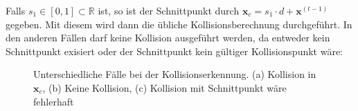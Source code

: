 Falls $s_1 \in [0, 1] \subset \mathbb{R}$ ist, so ist der Schnittpunkt durch $\textbf{x}_c = s_1 \cdot d + \textbf{x}^{(t-1)}$ gegeben. 
Mit diesem wird dann die übliche Kollisionsberechnung durchgeführt.
In den anderen Fällen darf keine Kollision ausgeführt werden, da entweder kein Schnittpunkt exisiert oder der Schnittpunkt kein gültiger Kollisionspunkt wäre:
\vspace{-0.5cm}
\begin{figure}[H]
	\label{fig:collision}
	\hspace{-1.8cm}
		\hspace{-2.4cm}
	\centering
	\caption{Unterschiedliche Fälle bei der Kollisionserkennung.
	(a) Kollision in $\textbf{x}_c$, (b) Keine Kollision, (c) Kollision mit Schnittpunkt wäre fehlerhaft}
\end{figure}

